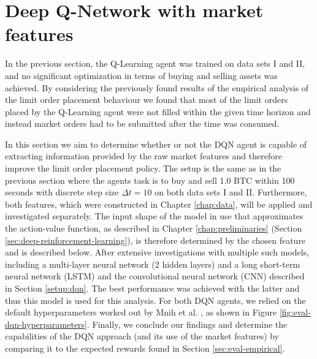 \section{Deep Q-Network with market features}
\label{sec:eval-dqn}
In the previous section, the Q-Learning agent was trained on data sets I and II, and no significant optimization in terms of buying and selling assets was achieved.
By considering the previously found results of the empirical analysis of the limit order placement behaviour we found that most of the limit orders placed by the Q-Learning agent were not filled within the given time horizon and instead market orders had to be submitted after the time was consumed.

In this section we aim to determine whether or not the DQN agent is capable of extracting information provided by the raw market features and therefore improve the limit order placement policy.
The setup is the same as in the previous section where the agents task is to buy and sell 1.0 BTC within 100 seconds with discrete step size $\Delta{t}=10$ on both data sets I and II.
Furthermore, both features, which were constructed in Chapter \ref{chap:data}, will be applied and investigated separately.
The input shape of the model in use that approximates the action-value function, as described in Chapter \ref{chap:preliminaries} (Section \ref{sec:deep-reinforcement-learning}), is therefore determined by the chosen feature and is described below.
After extensive investigations with multiple such models, including a multi-layer neural network\cite{svozil1997introduction} (2 hidden layers) and a long short-term neural network (LSTM)\cite{gers1999learning} and the convolutional neural network (CNN) described in Section \ref{setup:dqn}.
The best performance was achieved with the latter and thus this model is used for this analysis.
For both DQN agents, we relied on the default hyperparameters worked out by Mnih et al. \cite{mnih2015human}, as shown in Figure \ref{fig:eval-dqn-hyperparameters}.
Finally, we conclude our findings and determine the capabilities of the DQN approach (and its use of the market features) by comparing it to the expected rewards found in Section \ref{sec:eval-empirical}.
